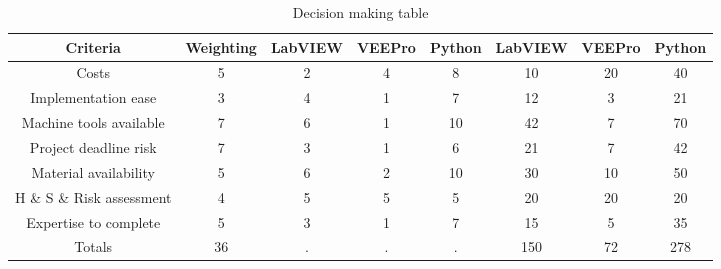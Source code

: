 \begin{table}[h!]
\centering
\begin{tabular}{||c c c c c c c c||}
 \hline
 Criteria & Weighting & LabVIEW & VEEPro & Python & LabVIEW & VEEPro & Python \\ [0.5ex]
 \hline
 Costs & 5 & 2 & 4 & 8 & 10 &	20 & 40 \\
 Implementation ease & 3 & 4 & 1 & 7 & 12 & 3 & 21 \\
Machine tools available & 7 & 6 & 1 & 10  & 42 & 7 & 70 \\
Project deadline risk & 7 & 3 & 1 & 6 & 21 & 7 & 42 \\
Material availability & 5 & 6 & 2 & 10 & 30 & 10 & 50 \\
H \& S \& Risk assessment & 4 & 5 & 5 & 5 & 20 & 20 & 20 \\
Expertise to complete & 5 & 3 & 1 & 7 & 15 & 5 & 35 \\
Totals & 36 & . & . & . & 150 & 72 & 278 \\
\hline
\end{tabular}
\caption{Decision making table}
\label{table:4}
\end{table}
